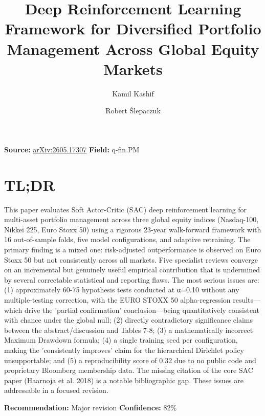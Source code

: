 \documentclass[11pt]{article}
\title{Deep Reinforcement Learning Framework for Diversified Portfolio Management Across Global Equity Markets}
\author{Kamil Kashif \and Robert Ślepaczuk}
\date{}
\begin{document}
\maketitle

\noindent\textbf{Source:} \href{https://arxiv.org/abs/2605.17307}{arXiv:2605.17307} \quad \textbf{Field:} q-fin.PM\\

\section*{TL;DR}
This paper evaluates Soft Actor-Critic (SAC) deep reinforcement learning for multi-asset portfolio management across three global equity indices (Nasdaq-100, Nikkei 225, Euro Stoxx 50) using a rigorous 23-year walk-forward framework with 16 out-of-sample folds, five model configurations, and adaptive retraining. The primary finding is a mixed one: risk-adjusted outperformance is observed on Euro Stoxx 50 but not consistently across all markets. Five specialist reviews converge on an incremental but genuinely useful empirical contribution that is undermined by several correctable statistical and reporting flaws. The most serious issues are: (1) approximately 60-75 hypothesis tests conducted at α=0.10 without any multiple-testing correction, with the EURO STOXX 50 alpha-regression results—which drive the 'partial confirmation' conclusion—being quantitatively consistent with chance under the global null; (2) directly contradictory significance claims between the abstract/discussion and Tables 7-8; (3) a mathematically incorrect Maximum Drawdown formula; (4) a single training seed per configuration, making the 'consistently improves' claim for the hierarchical Dirichlet policy unsupportable; and (5) a reproducibility score of 0.32 due to no public code and proprietary Bloomberg membership data. The missing citation of the core SAC paper (Haarnoja et al. 2018) is a notable bibliographic gap. These issues are addressable in a focused revision.

\textbf{Recommendation:} Major revision \quad \textbf{Confidence:} 82\%\\
\end{document}

